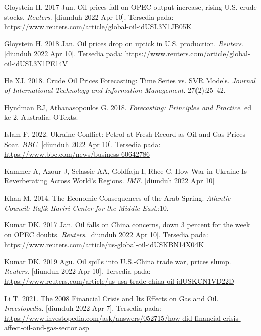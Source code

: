 \documentclass[
]{book}
\newlength{\cslhangindent}
\newlength{\cslentryspacingunit} %
\newenvironment{CSLReferences}[2] %
 {%
  \setlength{\parindent}{0pt}
  \ifodd #1
  \let\oldpar\par
  \def\par{\hangindent=\cslhangindent\oldpar}
  \fi
  \setlength{\parskip}{#2\cslentryspacingunit}
 }%
 {}
\begin{document}
\begin{CSLReferences}{0}{0}
\leavevmode{}%
Gloystein H. 2017 Jun. Oil prices fall on {OPEC} output increase, rising {U}.{S}. crude stocks. \emph{Reuters}. {[}diunduh 2022 Apr 10{]}. Tersedia pada: \url{https://www.reuters.com/article/global-oil-idUSL3N1JB05K}

\leavevmode{}%
Gloystein H. 2018 Jan. Oil prices drop on uptick in {U}.{S}. production. \emph{Reuters}. {[}diunduh 2022 Apr 10{]}. Tersedia pada: \url{https://www.reuters.com/article/global-oil-idUSL3N1PE14V}

\leavevmode{}%
He XJ. 2018. Crude Oil Prices Forecasting: Time Series vs. SVR Models. \emph{Journal of International Technology and Information Management}. 27(2):25--42.

\leavevmode{}%
Hyndman RJ, Athanasopoulos G. 2018. \emph{Forecasting: Principles and Practice}. ed ke-2. Australia: OTexts.

\leavevmode{}%
Islam F. 2022. Ukraine {Conflict}: {Petrol} at {Fresh} {Record} as {Oil} and {Gas} {Prices} {Soar}. \emph{BBC}. {[}diunduh 2022 Apr 10{]}. Tersedia pada: \url{https://www.bbc.com/news/business-60642786}

\leavevmode{}%
Kammer A, Azour J, Selassie AA, Goldfajn I, Rhee C. How {War} in {Ukraine} {Is} {Reverberating} {Across} {World}'s {Regions}. \emph{IMF}. {[}diunduh 2022 Apr 10{]}

\leavevmode{}%
Khan M. 2014. The {Economic} {Consequences} of the {Arab} {Spring}. \emph{Atlantic Council: Rafik Hariri Center for the Middle East}.:10.

\leavevmode{}%
Kumar DK. 2017 Jan. Oil falls on {China} concerns, down 3 percent for the week on {OPEC} doubts. \emph{Reuters}. {[}diunduh 2022 Apr 10{]}. Tersedia pada: \url{https://www.reuters.com/article/us-global-oil-idUSKBN14X04K}

\leavevmode{}%
Kumar DK. 2019 Agu. Oil spills into {U}.{S}.-{China} trade war, prices slump. \emph{Reuters}. {[}diunduh 2022 Apr 10{]}. Tersedia pada: \url{https://www.reuters.com/article/us-usa-trade-china-oil-idUSKCN1VD22D}

\leavevmode{}%
Li T. 2021. The 2008 Financial Crisis and Its Effects on Gas and Oil. \emph{Investopedia}. {[}diunduh 2022 Apr 7{]}. Tersedia pada: \url{https://www.investopedia.com/ask/answers/052715/how-did-financial-crisis-affect-oil-and-gas-sector.asp}


\end{CSLReferences}
\end{document}
